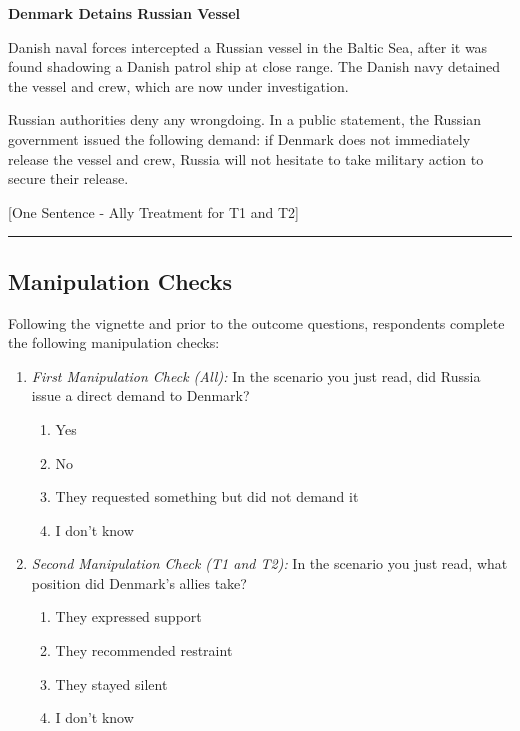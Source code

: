 
\medskip

\noindent \textbf{Denmark Detains Russian Vessel}

\medskip

Danish naval forces intercepted a Russian vessel in the Baltic Sea, after it was found shadowing a Danish patrol ship at close range. The Danish navy detained the vessel and crew, which are now under investigation.

\medskip

Russian authorities deny any wrongdoing. In a public statement, the Russian government issued the following demand: if Denmark does not immediately release the vessel and crew, Russia will not hesitate to take military action to secure their release.
\medskip

[One Sentence - Ally Treatment for T1 and T2]

\noindent\rule{\textwidth}{0.4pt}
\bigskip

\subsection{Manipulation Checks}

Following the vignette and prior to the outcome questions, respondents complete the following manipulation checks:

\begin{enumerate}
    \item \textit{First Manipulation Check (All):} In the scenario you just read, did Russia issue a direct demand to Denmark?
    \begin{enumerate}
        \item Yes
        \item No
        \item They requested something but did not demand it
        \item I don't know
    \end{enumerate}
    \item \textit{Second Manipulation Check (T1 and T2):} In the scenario you just read, what position did Denmark's allies take?
    \begin{enumerate}
        \item They expressed support 
        \item They recommended restraint
        \item They stayed silent
        \item I don't know
    \end{enumerate}
\end{enumerate}

